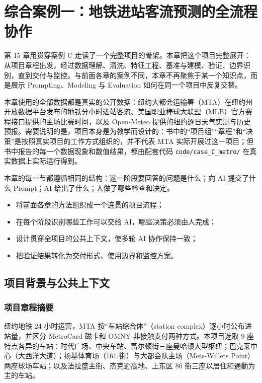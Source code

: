 \chapter[综合案例一：地铁客流预测全流程]{综合案例一：地铁进站客流预测的全流程协作}
\label{ch:case_one}

第 15 章用贯穿案例 C 走读了一个完整项目的骨架。本章把这个项目完整展开：从项目章程出发，经过数据理解、清洗、特征工程、基准与建模、验证、边界识别，直到交付与监控。与前面各章的案例不同，本章不再聚焦于某一个知识点，而是展示 Prompting、Modeling 与 Evaluation 如何在同一个项目中反复交替。

本章使用的全部数据都是真实的公开数据：纽约大都会运输署（MTA）在纽约州开放数据平台发布的地铁分小时进站客流\cite{mta2025hourly}、美国职业棒球大联盟（MLB）官方赛程接口提供的主场比赛时间，以及 Open-Meteo 提供的纽约逐日天气实测与历史预报。需要说明的是，项目本身是为教学而设计的：书中的“项目组”“章程”和“决策”是按照真实项目的工作方式组织的，并不代表 MTA 实际开展过这一项目；但书中报告的每一个数据现象和数值结果，都由配套代码 \texttt{code/case\_C\_metro/} 在真实数据上实际运行得到。

本章的每一节都遵循相同的结构：这一阶段要回答的问题是什么；向 AI 提交了什么 Prompt；AI 给出了什么；人做了哪些检查和决定。

\begin{chapterguide}
\begin{itemize}
  \item 将前面各章的方法组织成一个连贯的项目流程；
  \item 在每个阶段识别哪些工作可以交给 AI，哪些决策必须由人完成；
  \item 设计贯穿全项目的公共上下文，使多轮 AI 协作保持一致；
  \item 把验证结果转化为交付形式、使用边界和监控方案。
\end{itemize}
\end{chapterguide}

\section{项目背景与公共上下文}

\subsection{项目章程摘要}

纽约地铁 24 小时运营，MTA 按“车站综合体”（station complex）逐小时公布进站量，并区分 MetroCard 磁卡和 OMNY 非接触支付两种方式。本项目选取 9 座特点各异的车站：时代广场、中央车站、富尔顿街三座曼哈顿大型枢纽；巴克莱中心（大西洋大道）；扬基体育场（161 街）与大都会队主场（Mets-Willets Point）两座球场车站；以及法拉盛主街、杰克逊高地、上东区 86 街三座以居住和通勤为主的车站。

